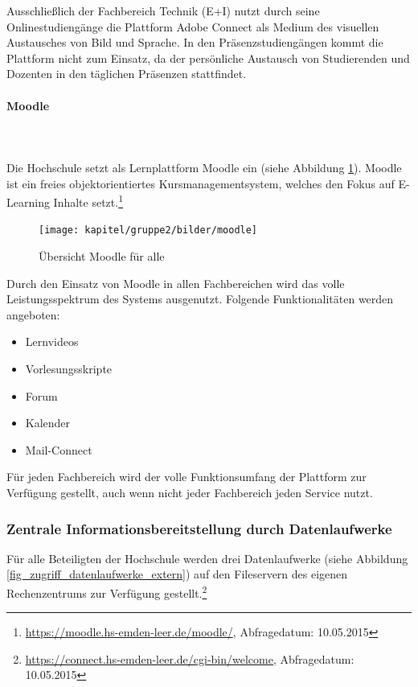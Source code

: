 Ausschließlich der Fachbereich Technik (E+I) nutzt durch seine Onlinestudiengänge die Plattform Adobe Connect als Medium des visuellen Austausches von Bild und Sprache. In den Präsenzstudiengängen kommt die Plattform nicht zum Einsatz, da der persönliche Austausch von Studierenden und Dozenten in den täglichen Präsenzen stattfindet.

\paragraph{Moodle}\mbox{}\\\\
\label{paragraph_moodle}
Die Hochschule setzt als Lernplattform Moodle ein (siehe Abbildung \ref{fig_moodle}). Moodle ist ein freies objektorientiertes Kursmanagementsystem, welches den Fokus auf E-Learning Inhalte setzt.\footnote{\url{https://moodle.hs-emden-leer.de/moodle/}, Abfragedatum: 10.05.2015}

\begin{figure}[h!]
	\centering
	\texttt{[image: kapitel/gruppe2/bilder/moodle]}
	\caption{Übersicht Moodle für alle \protect\footnotemark}
	\label{fig_moodle}
\end{figure}

Durch den Einsatz von Moodle in allen Fachbereichen wird das volle Leistungsspektrum des Systems ausgenutzt. Folgende Funktionalitäten werden angeboten:

\begin{itemize}
	\item Lernvideos
	\item Vorlesungsskripte
	\item Forum
	\item Kalender
	\item Mail-Connect
\end{itemize}

Für jeden Fachbereich wird der volle Funktionsumfang der Plattform zur Verfügung gestellt, auch wenn nicht jeder Fachbereich jeden Service nutzt. 

\subsubsection{Zentrale Informationsbereitstellung durch Datenlaufwerke}
\label{zentrale_Datenlaufwerke}
Für alle Beteiligten der Hochschule werden drei Datenlaufwerke (siehe Abbildung \ref{fig_zugriff_datenlaufwerke_extern}) auf den Fileservern des eigenen Rechenzentrums zur Verfügung gestellt.\footnote{\url{https://connect.hs-emden-leer.de/cgi-bin/welcome}, Abfragedatum: 10.05.2015}

